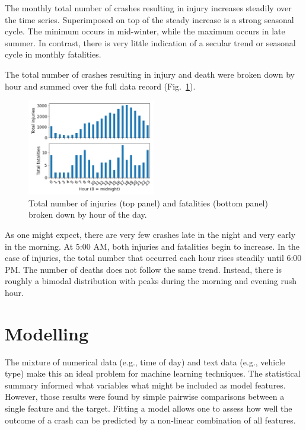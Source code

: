 \documentclass[twocolumn,oneside]{article}
\begin{document}
The monthly total number of crashes resulting in injury increases
steadily over the time series.  Superimposed on top of the steady
increase is a strong seasonal cycle.  The minimum occurs in
mid-winter, while the maximum occurs in late summer.  In contrast,
there is very little indication of a secular trend or seasonal cycle in
monthly fatalities.

The total number of crashes resulting in injury and death were broken
down by hour and summed over the full data record
(Fig.~\ref{fig:hours}).

\begin{figure}[h]
\centering
  \includegraphics[width=0.5\textwidth]{../figs/hourly_breakdown.png}
  \caption{Total number of injuries (top panel) and fatalities (bottom panel) broken down by hour of the day.}
\label{fig:hours}
\end{figure}

As one might expect, there are very few crashes late in the night and
very early in the morning.  At 5:00 AM, both injuries and fatalities
begin to increase.  In the case of injuries, the total number that
occurred each hour rises steadily until 6:00 PM.  The number of deaths
does not follow the same trend.  Instead, there is roughly a bimodal
distribution with peaks during the morning and evening rush hour.

\section{Modelling}

The mixture of numerical data (e.g., time of day) and text data (e.g.,
vehicle type) make this an ideal problem for machine learning
techniques.  The statistical summary informed what variables what
might be included as model features.  However, those results were
found by simple pairwise comparisons between a single feature and the
target.  Fitting a model allows one to assess how well the outcome of
a crash can be predicted by a non-linear combination of all features.
\end{document}
